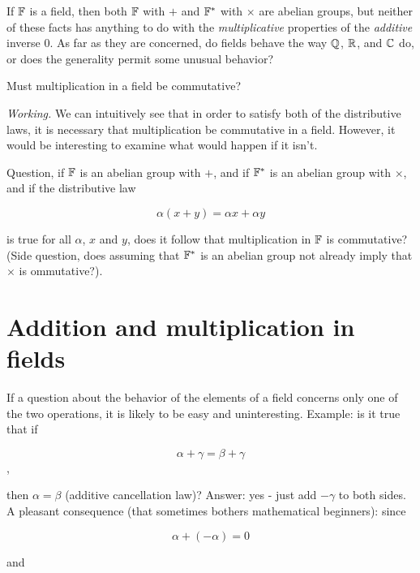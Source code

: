 If $\mathbb{F}$ is a field, then both $\mathbb{F}$ with $+$ and $\mathbb{F}^\ast$ with $\times$ are abelian groups, but neither of these facts has anything to do with the \textit{multiplicative} properties of the \textit{additive} inverse 0. As far as they are concerned, do fields behave the way $\mathbb{Q}$, $\mathbb{R}$, and $\mathbb{C}$ do, or does the generality permit some unusual behavior?

\begin{problem}
Must multiplication in a field be commutative?
\end{problem}

\textit{Working.} We can intuitively see that in order to satisfy both of the distributive laws, it is necessary that multiplication be commutative in a field. However, it would be interesting to examine what would happen if it isn't.

Question, if $\mathbb{F}$ is an abelian group with $+$, and if $\mathbb{F}^*$ is an abelian group with $\times$, and if the distributive law

\begin{equation}
    \alpha (x + y) = \alpha x + \alpha y
\end{equation}

is true for all $\alpha$, $x$ and $y$, does it follow that multiplication in $\mathbb{F}$ is commutative? (Side question, does assuming that $\mathbb{F}^*$ is an abelian group not already imply that $\times$ is ommutative?).


\section{Addition and multiplication in fields}

If a question about the behavior of the elements of a field concerns only one of the two operations, it is likely to be easy and uninteresting. Example: is it true that if

\begin{equation}
    \alpha + \gamma = \beta + \gamma
\end{equation},

then $\alpha = \beta$ (additive cancellation law)? Answer: yes - just add $-\gamma$ to both sides. A pleasant consequence (that sometimes bothers mathematical beginners): since

\begin{equation}
    \alpha + (-\alpha) = 0
\end{equation}

and

